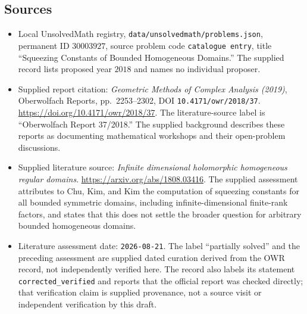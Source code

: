 \documentclass[11pt]{article}
\begin{document}
\subsection{Sources}
\begin{itemize}
\item Local UnsolvedMath registry, \texttt{data/unsolvedmath/problems.json}, permanent ID \(30003927\), source problem code \texttt{catalogue entry}, title ``Squeezing Constants of Bounded Homogeneous Domains.'' The supplied record lists proposed year \(2018\) and names no individual proposer.
\item Supplied report citation: \emph{Geometric Methods of Complex Analysis (2019)}, Oberwolfach Reports, pp.\ 2253--2302, DOI \texttt{10.4171/owr/2018/37}. \url{https://doi.org/10.4171/owr/2018/37}. The literature-source label is ``Oberwolfach Report 37/2018.'' The supplied background describes these reports as documenting mathematical workshops and their open-problem discussions.
\item Supplied literature source: \emph{Infinite dimensional holomorphic homogeneous regular domains}. \url{https://arxiv.org/abs/1808.03416}. The supplied assessment attributes to Chu, Kim, and Kim the computation of squeezing constants for all bounded symmetric domains, including infinite-dimensional finite-rank factors, and states that this does not settle the broader question for arbitrary bounded homogeneous domains.
\item Literature assessment date: \texttt{2026-08-21}. The label ``partially solved'' and the preceding assessment are supplied dated curation derived from the OWR record, not independently verified here. The record also labels its statement \texttt{corrected\_verified} and reports that the official report was checked directly; that verification claim is supplied provenance, not a source visit or independent verification by this draft.
\end{itemize}
\end{document}
